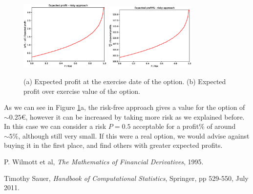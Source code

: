 \documentclass[8 pt]{article}
\begin{document}
\begin{figure}[H]
  \begin{center}
    \includegraphics[width=0.4\textwidth]{graphs/P-oP.eps}
    \includegraphics[width=0.4\textwidth]{graphs/P-Profit.eps}
    \caption{(a) Expected profit at the exercise date of the option. (b) Expected profit over exercise value of the option.}
    \label{fig:oP_plots}
  \end{center}
\end{figure}

As we can see in Figure \ref{fig:oP_plots}a, the risk-free approach gives a value for the option of $\sim 0.25$\euro, however it can be increased by taking more risk as we explained before. In this case we can consider a risk $P = 0.5$ acceptable for a profit\% of around $\sim 5\%$, although still very small. If this were a real option, we would advise against buying it in the first place, and find others with greater expected profits.

\begin{thebibliography}{28}
\raggedright
{}

 P. Wilmott et al, \emph{The Mathematics of Financial Derivatives}, 1995.

 Timothy Sauer, \emph{Handbook of Computational Statistics}, Springer, pp 529-550, July 2011.

\end{thebibliography}
\end{document}

